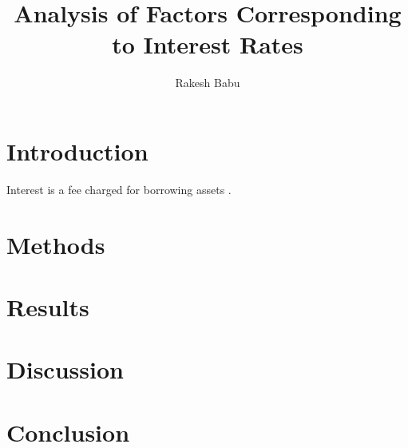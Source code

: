 \documentclass{article}
\begin{document}
\title{Analysis of Factors Corresponding to Interest Rates}
\author{Rakesh Babu}
\maketitle

\section{Introduction}
Interest is a fee charged for borrowing assets \cite{wikiInterest}.
\section{Methods}

\section{Results}

\section{Discussion}

\section{Conclusion}


\end{document}
